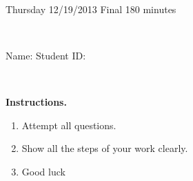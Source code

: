 \documentclass[12pt, oneside]{amsart}
\begin{document}
%

\begin{center}
    \hrulefill\\
    {\bf \textsf{\raisebox{-0.10cm}{Fall 2013: MATH 163} \hspace{\fill} 
            \raisebox{-0.10cm}{Ordinary Differential Equations} \hspace{\fill}
            \raisebox{-0.10cm}{David Karapetyan}}}\\
    \hrulefill\\
    {\large \rule{0cm}{1.2cm} \textsf{Thursday 12/19/2013} \hfill
        \textsf{Final} \hfill  \textsf{180 minutes}}\\
    {\large\rule{0cm}{1.2cm}\textsf{Name: \framebox[2.9in]{\rule{0cm}{0.8cm}} 
            \hspace{\fill}
            Student ID: \framebox[2.1in]{\rule{0cm}{0.8cm}}}}\\
\end{center}
\vspace{0.8cm}

\noindent
{\bf \textsf{Instructions.}}

\begin{enumerate}
    \item Attempt all questions.   
    \item Show all the steps of your work clearly.  
    \item Good luck 
\end{enumerate}

\vfill

\end{document}
